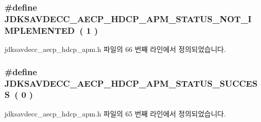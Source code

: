 \subsubsection[{\texorpdfstring{J\+D\+K\+S\+A\+V\+D\+E\+C\+C\+\_\+\+A\+E\+C\+P\+\_\+\+H\+D\+C\+P\+\_\+\+A\+P\+M\+\_\+\+S\+T\+A\+T\+U\+S\+\_\+\+N\+O\+T\+\_\+\+I\+M\+P\+L\+E\+M\+E\+N\+T\+ED}{JDKSAVDECC_AECP_HDCP_APM_STATUS_NOT_IMPLEMENTED}}]{\setlength{\rightskip}{0pt plus 5cm}\#define J\+D\+K\+S\+A\+V\+D\+E\+C\+C\+\_\+\+A\+E\+C\+P\+\_\+\+H\+D\+C\+P\+\_\+\+A\+P\+M\+\_\+\+S\+T\+A\+T\+U\+S\+\_\+\+N\+O\+T\+\_\+\+I\+M\+P\+L\+E\+M\+E\+N\+T\+ED~( 1 )}\hypertarget{group__aecpdu__hdcp__apm__status_ga86156abbaf3bacf6adf0b0449905e131}{}\label{group__aecpdu__hdcp__apm__status_ga86156abbaf3bacf6adf0b0449905e131}


jdksavdecc\+\_\+aecp\+\_\+hdcp\+\_\+apm.\+h 파일의 66 번째 라인에서 정의되었습니다.

\subsubsection[{\texorpdfstring{J\+D\+K\+S\+A\+V\+D\+E\+C\+C\+\_\+\+A\+E\+C\+P\+\_\+\+H\+D\+C\+P\+\_\+\+A\+P\+M\+\_\+\+S\+T\+A\+T\+U\+S\+\_\+\+S\+U\+C\+C\+E\+SS}{JDKSAVDECC_AECP_HDCP_APM_STATUS_SUCCESS}}]{\setlength{\rightskip}{0pt plus 5cm}\#define J\+D\+K\+S\+A\+V\+D\+E\+C\+C\+\_\+\+A\+E\+C\+P\+\_\+\+H\+D\+C\+P\+\_\+\+A\+P\+M\+\_\+\+S\+T\+A\+T\+U\+S\+\_\+\+S\+U\+C\+C\+E\+SS~( 0 )}\hypertarget{group__aecpdu__hdcp__apm__status_ga830802907e2a433a58b74c12928708b5}{}\label{group__aecpdu__hdcp__apm__status_ga830802907e2a433a58b74c12928708b5}


jdksavdecc\+\_\+aecp\+\_\+hdcp\+\_\+apm.\+h 파일의 65 번째 라인에서 정의되었습니다.


